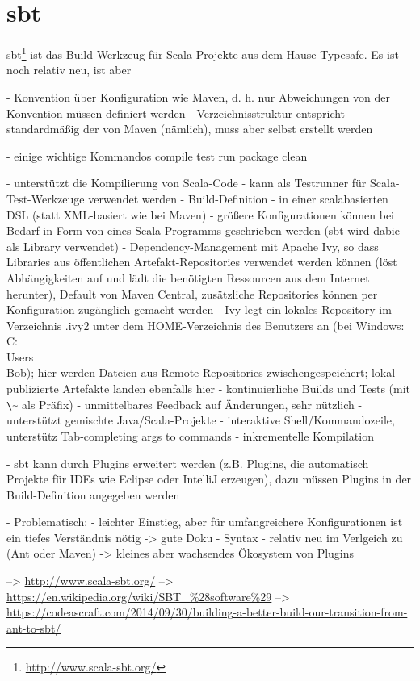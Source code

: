 \documentclass[a4paper, 12pt, hidelinks, listof=totoc, listoftables=totoc, bibliography=totoc]{scrreprt}
\newcommand{\code}[1]{\lstinline[language=Scala, style=inline]|#1|}
\begin{document}
\section{sbt}

sbt\footnote{\url{http://www.scala-sbt.org/}} ist das Build-Werkzeug für Scala-Projekte aus dem Hause Typesafe. Es ist noch relativ neu, ist aber 

- Konvention über Konfiguration wie Maven, d. h. nur Abweichungen von der Konvention müssen definiert werden
- Verzeichnisstruktur entspricht standardmäßig der von Maven (nämlich), muss aber selbst erstellt werden

- einige wichtige Kommandos
	compile
	test
	run
	package
	clean

- unterstützt die Kompilierung von Scala-Code
- kann als Testrunner für Scala-Test-Werkzeuge verwendet werden
- Build-Definition
	- in einer scalabasierten DSL (statt XML-basiert wie bei Maven)
	- größere Konfigurationen können bei Bedarf in Form von eines Scala-Programms geschrieben werden (sbt wird dabie als Library verwendet)
- Dependency-Management mit Apache Ivy, so dass Libraries aus öffentlichen Artefakt-Repositories verwendet werden können (löst Abhängigkeiten auf und lädt die benötigten Ressourcen aus dem Internet herunter), Default von Maven Central, zusätzliche Repositories können per Konfiguration zugänglich gemacht werden
	- Ivy legt ein lokales Repository im Verzeichnis .ivy2 unter dem HOME-Verzeichnis des Benutzers an (bei Windows: C:\\Users\\Bob); hier werden Dateien aus Remote Repositories zwischengespeichert; lokal publizierte Artefakte landen ebenfalls hier
- kontinuierliche Builds und Tests (mit \code{\~} als Präfix) - unmittelbares Feedback auf Änderungen, sehr nützlich
- unterstützt gemischte Java/Scala-Projekte
- interaktive Shell/Kommandozeile, unterstütz Tab-completing args to commands
- inkrementelle Kompilation

- sbt kann durch Plugins erweitert werden (z.B. Plugins, die automatisch Projekte für IDEs wie Eclipse oder IntelliJ erzeugen), dazu müssen Plugins in der Build-Definition angegeben werden

- Problematisch:
	- leichter Einstieg, aber für umfangreichere Konfigurationen ist ein tiefes Verständnis nötig -> gute Doku
	- Syntax
	- relativ neu im Verlgeich zu (Ant oder Maven) -> kleines aber wachsendes Ökosystem von Plugins

-->  \url{http://www.scala-sbt.org/}
-->  \url{https://en.wikipedia.org/wiki/SBT_%28software%29}
-->  \url{https://codeascraft.com/2014/09/30/building-a-better-build-our-transition-from-ant-to-sbt/}
\end{document}
